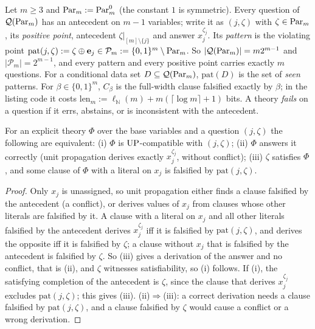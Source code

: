 Let $m\ge3$ and $\mathrm{Par}_m:=\mathrm{Par}^0_m$ (the constant $1$ is symmetric). Every question of $\mathcal Q(\mathrm{Par}_m)$ has an antecedent on $m-1$ variables; write it as $(j,\zeta)$ with $\zeta\in\mathrm{Par}_m$, its \emph{positive point}, antecedent $\zeta|_{[m]\setminus\{j\}}$ and answer $x_j^{\zeta_j}$. Its \emph{pattern} is the violating point $\mathrm{pat}(j,\zeta):=\zeta\oplus\mathbf e_j\in\mathcal P_m:=\{0,1\}^m\setminus\mathrm{Par}_m$. So $\lvert\mathcal Q(\mathrm{Par}_m)\rvert=m2^{m-1}$ and $\lvert\mathcal P_m\rvert=2^{m-1}$, and every pattern and every positive point carries exactly $m$ questions. For a conditional data set $D\subseteq\mathcal Q(\mathrm{Par}_m)$, $\mathrm{pat}(D)$ is the set of \emph{seen} patterns. For $\beta\in\{0,1\}^m$, $C_\beta$ is the full-width clause falsified exactly by $\beta$; in the listing code it costs $\mathrm{len}_m:=\ell_{\mathbb N}(m)+m(\lceil\log m\rceil+1)$ bits. A theory \emph{fails} on a question if it errs, abstains, or is inconsistent with the antecedent.

\begin{lemma}\label{lem:shape:noaux}
For an explicit theory $\Phi$ over the base variables and a question $(j,\zeta)$ the following are equivalent: (i) $\Phi$ is $\mathrm{UP}$-compatible with $(j,\zeta)$; (ii) $\Phi$ answers it correctly (unit propagation derives exactly $x_j^{\zeta_j}$, without conflict); (iii) $\zeta$ satisfies $\Phi$, and some clause of $\Phi$ with a literal on $x_j$ is falsified by $\mathrm{pat}(j,\zeta)$.
\end{lemma}

\begin{proof}
Only $x_j$ is unassigned, so unit propagation either finds a clause falsified by the antecedent (a conflict), or derives values of $x_j$ from clauses whose other literals are falsified by it. A clause with a literal on $x_j$ and all other literals falsified by the antecedent derives $x_j^{\zeta_j}$ iff it is falsified by $\mathrm{pat}(j,\zeta)$, and derives the opposite iff it is falsified by $\zeta$; a clause without $x_j$ that is falsified by the antecedent is falsified by $\zeta$. So (iii) gives a derivation of the answer and no conflict, that is (ii), and $\zeta$ witnesses satisfiability, so (i) follows. If (i), the satisfying completion of the antecedent is $\zeta$, since the clause that derives $x_j^{\zeta_j}$ excludes $\mathrm{pat}(j,\zeta)$; this gives (iii). (ii)$\Rightarrow$(iii): a correct derivation needs a clause falsified by $\mathrm{pat}(j,\zeta)$, and a clause falsified by $\zeta$ would cause a conflict or a wrong derivation.
\end{proof}

